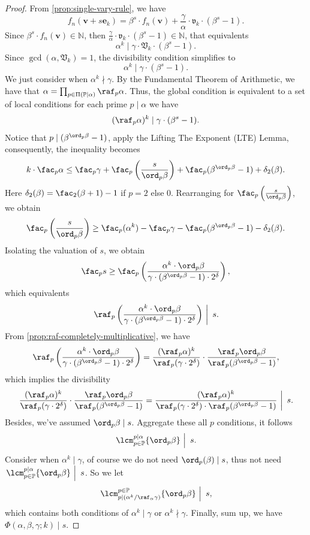 \begin{proof}
    From \cref{prop:single-vary-rule}, we have
    \[ f_{n}(\bm{v}+s\bm{e}_{k}) = \beta^{s}\cdot f_{n}(\bm{v}) + \frac{\gamma}{\alpha}\cdot\mathfrak{v}_{k}\cdot(\beta^{s} - 1). \]
    Since $\beta^{s}\cdot f_{n}(\bm{v}) \in \mathbb{N}$, then $\frac{\gamma}{\alpha}\cdot\mathfrak{v}_{k}\cdot(\beta^{s} - 1) \in \mathbb{N}$, that equivalents
    \[\alpha^{k} \mid \gamma\cdot\mathfrak{V}_{k}\cdot(\beta^{s} - 1).\]
    Since $\gcd(\alpha, \mathfrak{V}_{k}) = 1$, the divisibility condition simplifies to
    \[\alpha^{k} \mid \gamma\cdot(\beta^{s} - 1).\]
    We just consider when $\alpha^{k} \nmid \gamma$.
    By the Fundamental Theorem of Arithmetic, we have that $\alpha = \prod_{p \in \Pi(\mathbb{P} \mid \alpha)} \raf_{p}\alpha$. Thus, the global condition is equivalent to a set of local conditions for each prime $p \mid \alpha$ we have
    \[ (\raf_{p}\alpha)^{k} \mid \gamma\cdot(\beta^{s} - 1). \]
    Notice that $p \mid (\beta^{\ord_{p}\beta} - 1)$, apply the Lifting The Exponent (LTE) Lemma, consequently, the inequality becomes
    \[ k\cdot\fac_{p}\alpha \le \fac_{p}\gamma + \fac_{p}\left(\frac{s}{\ord_{p}\beta}\right) + \fac_{p}(\beta^{\ord_{p}\beta} - 1) + \delta_2(\beta). \]
    Here $\delta_2(\beta) = \fac_2(\beta + 1) - 1$ if $p = 2$ else $0$.
    Rearranging for $\fac_{p}\left(\frac{s}{\ord_{p}\beta}\right)$, we obtain
    \[ \fac_{p}\left(\frac{s}{\ord_{p}\beta}\right) \ge \fac_{p}(\alpha^{k}) - \fac_{p}\gamma - \fac_{p}(\beta^{\ord_{p}\beta} - 1) - \delta_2(\beta). \]
    Isolating the valuation of $s$, we obtain
    \[ \fac_{p}s \ge \fac_{p}\left(\frac{\alpha^{k}\cdot\ord_{p}\beta}{\gamma\cdot(\beta^{\ord_{p}\beta} - 1)\cdot2^{\delta}}\right), \]
    which equivalents
    \[ \left.\raf_{p}\left(\frac{\alpha^{k}\cdot\ord_{p}\beta}{\gamma\cdot(\beta^{\ord_{p}\beta} - 1)\cdot2^{\delta}}\right)\ \right\vert\ s. \]
    From \cref{prop:raf-completely-multiplicative}, we have
    \[ \raf_{p}\left(\frac{\alpha^{k}\cdot\ord_{p}\beta}{\gamma\cdot(\beta^{\ord_{p}\beta} - 1)\cdot2^{\delta}}\right) = \frac{(\raf_{p}\alpha)^{k}}{\raf_{p}(\gamma\cdot2^{\delta})}\cdot\frac{\raf_{p}\ord_{p}\beta}{\raf_{p}(\beta^{\ord_{p}\beta} - 1)}, \]
    which implies the divisibility
    \[ \left. \frac{(\raf_{p}\alpha)^{k}}{\raf_{p}(\gamma\cdot2^{\delta})}\cdot\frac{\raf_{p}\ord_{p}\beta}{\raf_{p}(\beta^{\ord_{p}\beta} - 1)} = \frac{(\raf_{p}\alpha)^{k}}{\raf_{p}(\gamma\cdot2^{\delta})\cdot\raf_{p}(\beta^{\ord_{p}\beta} - 1)}\ \right\vert\ s. \]
    Besides, we've assumed $\ord_{p}\beta \mid s$. Aggregate these all $p$ conditions, it follows
    \[ \left.\lcm_{p\in\mathbb{P}}^{p\mid \alpha}\{\ord_{p}\beta\}\ \right\vert\ s. \]
    Consider when $\alpha^{k}\mid \gamma$, of course we do not need $\ord_{p}(\beta) \mid s$, thus not need $\left.\lcm_{p\in\mathbb{P}}^{p\mid \alpha}\{\ord_{p}\beta\}\ \right\vert\ s$. So we let
    \[ \left.\lcm_{p\mid (\alpha^{k}/\raf_{\alpha}\gamma)}^{p\in\mathbb{P}}\{\ord_{p}\beta\}\ \right\vert\ s, \]
    which contains both conditions of $\alpha^{k}\mid \gamma$ or $\alpha^{k}\nmid \gamma$.
    Finally, sum up, we have $\Phi(\alpha,\beta,\gamma;k) \mid s$.
\end{proof}
